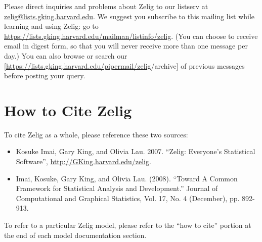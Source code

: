 \documentclass[letterpaper,10pt,english]{sphinxmanual}
\begin{document}
Please direct inquiries and problems about Zelig to our listserv at \href{mailto:zelig@lists.gking.harvard.edu}{zelig@lists.gking.harvard.edu}. We suggest you subscribe to this mailing list while learning and using Zelig: go to \href{https://lists.gking.harvard.edu/mailman/listinfo/zelig}{https://lists.gking.harvard.edu/mailman/listinfo/zelig}. (You can choose to receive email in digest form, so that you will never receive more than one message per day.) You can also browse or search our {[}\href{https://lists.gking.harvard.edu/pipermail/zelig}{https://lists.gking.harvard.edu/pipermail/zelig}/\textbar{}\textbar{}archive{]} of previous messages before posting your query.


\section{How to Cite Zelig}
\label{1_introduction:how-to-cite-zelig}
To cite Zelig as a whole, please reference these two sources:
\begin{itemize}
\item {} 
Kosuke Imai, Gary King, and Olivia Lau. 2007. ``Zelig: Everyone's Statistical Software'', \href{http://GKing.harvard.edu/zelig}{http://GKing.harvard.edu/zelig}.

\item {} 
Imai, Kosuke, Gary King, and Olivia Lau. (2008). “Toward A Common Framework for Statistical Analysis and Development.” Journal of Computational and Graphical Statistics, Vol. 17, No. 4 (December), pp. 892-913.

\end{itemize}

To refer to a particular Zelig model, please refer to the “how to cite” portion at the end of each model documentation section.
\end{document}

